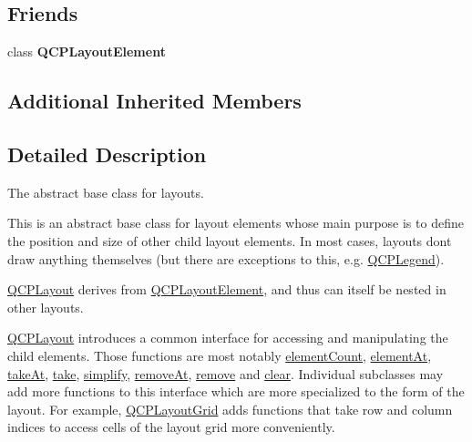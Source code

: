 \subsection*{Friends}
\begin{DoxyCompactItemize}
\item 
\mbox{\label{class_q_c_p_layout_a9617e8ee457014d1c3a9f8379d3c667d}} 
class {\bfseries Q\+C\+P\+Layout\+Element}
\end{DoxyCompactItemize}
\subsection*{Additional Inherited Members}


\subsection{Detailed Description}
The abstract base class for layouts. 

This is an abstract base class for layout elements whose main purpose is to define the position and size of other child layout elements. In most cases, layouts don\textquotesingle{}t draw anything themselves (but there are exceptions to this, e.\+g. \hyperlink{class_q_c_p_legend}{Q\+C\+P\+Legend}).

\hyperlink{class_q_c_p_layout}{Q\+C\+P\+Layout} derives from \hyperlink{class_q_c_p_layout_element}{Q\+C\+P\+Layout\+Element}, and thus can itself be nested in other layouts.

\hyperlink{class_q_c_p_layout}{Q\+C\+P\+Layout} introduces a common interface for accessing and manipulating the child elements. Those functions are most notably \hyperlink{class_q_c_p_layout_a39d3e9ef5d9b82ab1885ba1cb9597e56}{element\+Count}, \hyperlink{class_q_c_p_layout_afa73ca7d859f8a3ee5c73c9b353d2a56}{element\+At}, \hyperlink{class_q_c_p_layout_a5a79621fa0a6eabb8b520cfc04fb601a}{take\+At}, \hyperlink{class_q_c_p_layout_ada26cd17e56472b0b4d7fbbc96873e4c}{take}, \hyperlink{class_q_c_p_layout_a41e6ac049143866e8f8b4964efab01b2}{simplify}, \hyperlink{class_q_c_p_layout_a2403f684fee3ce47132faaeed00bb066}{remove\+At}, \hyperlink{class_q_c_p_layout_a6c58f537d8086f352576ab7c5b15d0bc}{remove} and \hyperlink{class_q_c_p_layout_a02883bdf2769b5b227f0232dba1ac4ee}{clear}. Individual subclasses may add more functions to this interface which are more specialized to the form of the layout. For example, \hyperlink{class_q_c_p_layout_grid}{Q\+C\+P\+Layout\+Grid} adds functions that take row and column indices to access cells of the layout grid more conveniently.

